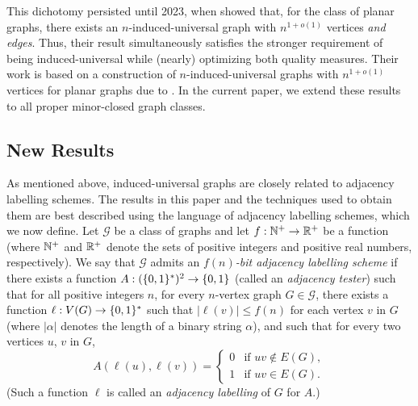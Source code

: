 \documentclass{patmorin}
\renewcommand{\leq}{\leqslant}
\newcommand{\defin}[1]{\emph{\textcolor{brightmaroon}{#1}}}
\newcommand{\Oh}{O}
\DeclarePairedDelimiter{\set}{\{}{\}}
\newcommand{\calF}{\mathcal{F}}
\newcommand{\calG}{\mathcal{G}}
\newcommand{\calP}{\mathcal{P}}
\begin{document}

This dichotomy persisted until 2023, when \citet{EJM23} showed that, for the class of planar graphs, there exists an $n$-induced-universal graph with $n^{1+o(1)}$ vertices \emph{and edges}.  Thus, their result simultaneously satisfies the stronger requirement of being induced-universal while (nearly) optimizing both quality measures.  Their work is based on a construction of $n$-induced-universal graphs with $n^{1+o(1)}$ vertices for planar graphs due to \citet{dujmovic.esperet.ea:adjacency}.  In the current paper, we extend these results to all proper minor-closed graph classes.  


\subsection{New Results}

As mentioned above, induced-universal graphs are closely related to adjacency labelling schemes.  The results in this paper and the techniques used to obtain them are best described using the language of adjacency labelling schemes, which we now define.
Let $\calG$ be a class of graphs and let $f:\mathbb{N}^+\to\mathbb{R}^+$ be a function (where $\mathbb{N}^+$ and $\mathbb{R}^+$ denote the sets of positive integers and positive real numbers, respectively).
We say that $\calG$ admits an \defin{$f(n)$-bit adjacency labelling scheme} if there exists a function $A:(\set{0,1}^*)^2\to\set{0,1}$ (called an \defin{adjacency tester}) such that for all positive integers $n$, for every $n$-vertex graph $G\in\calG$, there exists a function $\ell: V(G)\to\set{0,1}^*$ such that
$|\ell(v)|\leq f(n)$ for each vertex $v$ in $G$ (where $|\alpha|$ denotes the length of a binary string $\alpha$), and such that
for every two vertices $u$, $v$ in $G$,
\[
  A(\ell(u),\ell(v))=\begin{cases}
    0 & \textrm{if $uv\notin E(G)$}, \\
    1 & \textrm{if $uv\in E(G)$}.
  \end{cases}
\]
(Such a function $\ell$ is called an \defin{adjacency labelling} of $G$ for $A$.) 
\end{document}

